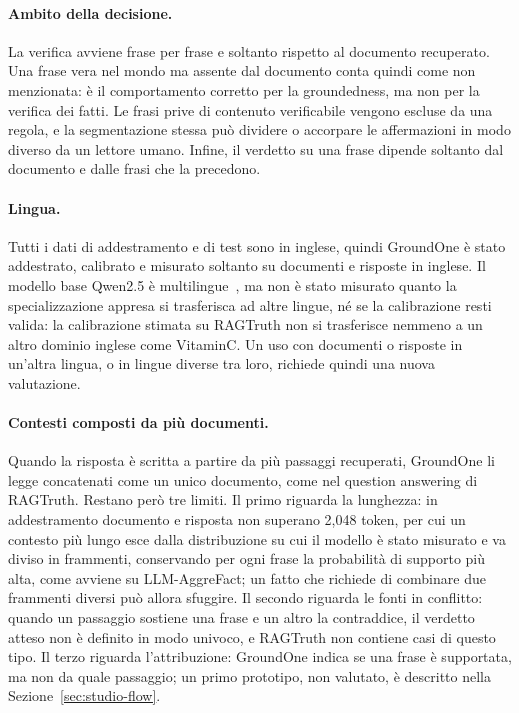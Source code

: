 \paragraph{Ambito della decisione.} La verifica avviene frase per frase e soltanto rispetto al documento recuperato. Una
frase vera nel mondo ma assente dal documento conta quindi come non menzionata: è il comportamento corretto per la
groundedness, ma non per la verifica dei fatti. Le frasi prive di contenuto verificabile vengono escluse da una regola, e
la segmentazione stessa può dividere o accorpare le affermazioni in modo diverso da un lettore umano. Infine, il verdetto
su una frase dipende soltanto dal documento e dalle frasi che la precedono.

\paragraph{Lingua.} Tutti i dati di addestramento e di test sono in inglese, quindi GroundOne è stato addestrato,
calibrato e misurato soltanto su documenti e risposte in inglese. Il modello base Qwen2.5 è multilingue~\cite{qwen2024qwen25},
ma non è stato misurato quanto la specializzazione appresa si trasferisca ad altre lingue, né se la calibrazione resti
valida: la calibrazione stimata su RAGTruth non si trasferisce nemmeno a un altro dominio inglese come VitaminC. Un uso
con documenti o risposte in un'altra lingua, o in lingue diverse tra loro, richiede quindi una nuova valutazione.

\paragraph{Contesti composti da più documenti.} Quando la risposta è scritta a partire da più passaggi recuperati,
GroundOne li legge concatenati come un unico documento, come nel question answering di RAGTruth. Restano però tre
limiti. Il primo riguarda la lunghezza: in addestramento documento e risposta non superano 2{,}048 token, per cui un
contesto più lungo esce dalla distribuzione su cui il modello è stato misurato e va diviso in frammenti, conservando
per ogni frase la probabilità di supporto più alta, come avviene su LLM-AggreFact; un fatto che richiede di combinare
due frammenti diversi può allora sfuggire. Il secondo riguarda le fonti in conflitto: quando un passaggio sostiene una
frase e un altro la contraddice, il verdetto atteso non è definito in modo univoco, e RAGTruth non contiene casi di
questo tipo. Il terzo riguarda l'attribuzione: GroundOne indica se una frase è supportata, ma non da quale passaggio; un primo prototipo, non valutato, è descritto nella Sezione~\ref{sec:studio-flow}.

